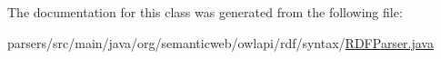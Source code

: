 The documentation for this class was generated from the following file\-:\begin{DoxyCompactItemize}
\item 
parsers/src/main/java/org/semanticweb/owlapi/rdf/syntax/\hyperlink{_r_d_f_parser_8java}{R\-D\-F\-Parser.\-java}\end{DoxyCompactItemize}
